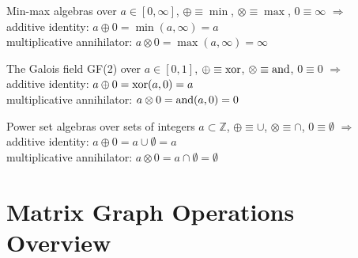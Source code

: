 Min-max algebras over $a \in [0,\infty]$, $\oplus \equiv \min$, $\otimes \equiv \max$, $0 \equiv \infty$ $\Rightarrow$ \\
additive identity: $a \oplus 0  =  \min(a,\infty) = a$ \\
multiplicative annihilator: $a \otimes 0 = \max(a,\infty) = \infty$

The Galois field GF(2) over $a \in [0,1]$, $\oplus \equiv {\rm xor}$, $\otimes \equiv {\rm and}$, $0 \equiv 0$ $\Rightarrow$ \\
additive identity: $a \oplus 0  = {\rm xor}(a,0) = a$ \\
multiplicative annihilator: $a \otimes 0 = {\rm and}(a,0) = 0$

Power set algebras over sets of integers $a \subset \mathbb{Z}$, $\oplus \equiv \cup$, $\otimes \equiv \cap$, $0 \equiv \emptyset$ $\Rightarrow$ \\
additive identity: $a \oplus 0  =  a \cup \emptyset = a$ \\
multiplicative annihilator: $a \otimes 0 = a \cap \emptyset = \emptyset$


\section{Matrix Graph Operations Overview}

